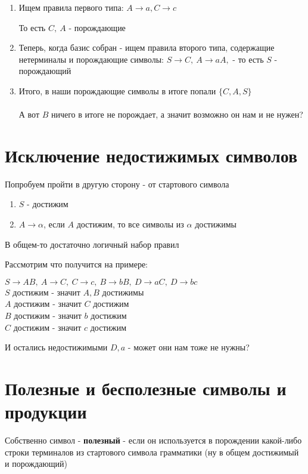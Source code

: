 \documentclass{article}
\begin{document}
\begin{enumerate}
  \item Ищем правила первого типа: 
        $A \to a, C \to c$
            
    То есть $C, \ A$ - порождающие
    \item Теперь, когда базис собран - ищем правила второго типа, содержащие
    нетерминалы и порождающие символы:
    $S \to C, \ A \to aA, $ - то есть $S$ - порождающий
    \item Итого, в наши порождающие символы в итоге попали $\{C,A,S\}$
    \\\\
    А вот $B$ ничего в итоге не порождает, а значит возможно он нам и не нужен?
\end{enumerate}

\section{Исключение недостижимых символов}
Попробуем пройти в другую сторону - от стартового символа
\begin{enumerate}
  \item $S$ - достижим
    \item $A \to \alpha$, если $A$ достижим, то все символы из $\alpha$ достижимы
\end{enumerate}

В общем-то достаточно логичный набор правил

Рассмотрим что получится на примере:
\begin{center}
$ S \to AB, \ A \to C, \ C \to c, \ B \to bB, \ D \to aC, \ D \to bc$\\
$S$ достижим - значит $A, B$ достижимы\\
$A$ достижим - значит $C$ достижим\\
$B$ достижим - значит $b$ достижим\\
$C$ достижим - значит $c$ достижим\\
\end{center}

И остались недостижимыми $D, a$ - может они нам тоже не нужны?

\section{Полезные и бесполезные символы и продукции}
Собственно символ - \textbf{полезный} - если он используется в порождении какой-либо строки терминалов из стартового символа грамматики (ну в общем достижимый и порождающий)
\end{document}
